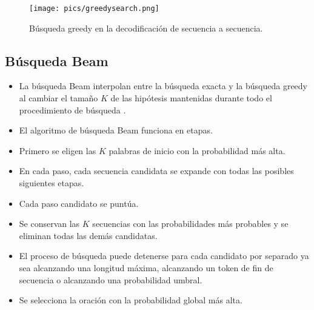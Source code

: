 \documentclass{book}
\begin{document}
\begin{figure}[h]
  \centering
  \texttt{[image: pics/greedysearch.png]}
  \caption{Búsqueda greedy en la decodificación de secuencia a secuencia.}
\end{figure}



\subsection{Búsqueda Beam}
\begin{itemize}
\item La búsqueda Beam interpolan entre la búsqueda exacta y la búsqueda greedy al cambiar el tamaño $K$ de las hipótesis mantenidas durante todo el procedimiento de búsqueda \cite{cho2015natural}.
\item El algoritmo de búsqueda Beam funciona en etapas.
\item Primero se eligen las $K$ palabras de inicio con la probabilidad más alta.
\item En cada paso, cada secuencia candidata se expande con todas las posibles siguientes etapas.
\item Cada paso candidato se puntúa.
\item Se conservan las $K$ secuencias con las probabilidades más probables y se eliminan todas las demás candidatas.
\item El proceso de búsqueda puede detenerse para cada candidato por separado ya sea alcanzando una longitud máxima, alcanzando un token de fin de secuencia o alcanzando una probabilidad umbral.
\item Se selecciona la oración con la probabilidad global más alta.
\end{itemize}

\end{document}
